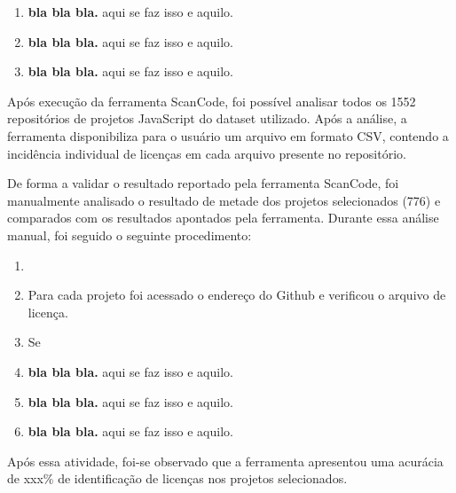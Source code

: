 \begin{enumerate}
    \item \textbf{bla bla bla.} aqui se faz isso e aquilo.
    \item \textbf{bla bla bla.} aqui se faz isso e aquilo.
    \item \textbf{bla bla bla.} aqui se faz isso e aquilo.
\end{enumerate}

Após execução da ferramenta ScanCode, foi possível analisar todos os 1552 repositórios de projetos JavaScript do dataset utilizado. Após a análise, a ferramenta disponibiliza para o usuário um arquivo em formato CSV, contendo a incidência individual de licenças em cada arquivo presente no repositório. 

De forma a validar o resultado reportado pela ferramenta ScanCode, foi manualmente analisado o resultado de metade dos projetos selecionados (776) e comparados com os resultados apontados pela ferramenta. Durante essa análise manual, foi seguido o seguinte procedimento: 

\begin{enumerate}
    \item 
    \item Para cada projeto foi acessado o endereço do Github e verificou o arquivo de licença.
    \item Se 
    \item \textbf{bla bla bla.} aqui se faz isso e aquilo.
    \item \textbf{bla bla bla.} aqui 
    se faz isso e aquilo.
    \item \textbf{bla bla bla.} aqui se faz isso e aquilo.
\end{enumerate}

Após essa atividade, foi-se observado que a ferramenta apresentou uma acurácia de xxx\% de identificação de licenças nos projetos selecionados.


